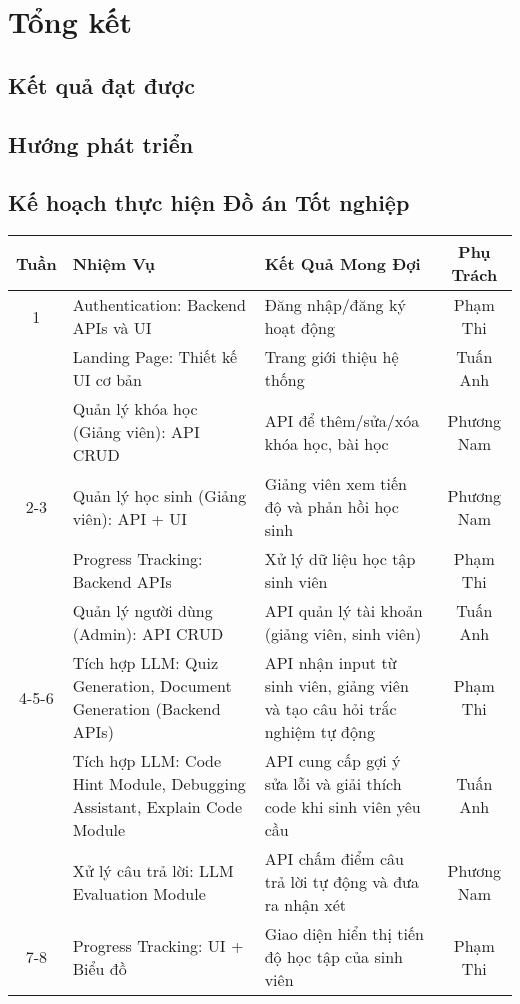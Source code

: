 \chapter{Tổng kết}
\section{Kết quả đạt được}
\section{Hướng phát triển}
\newpage
\section*{Kế hoạch thực hiện Đồ án Tốt nghiệp}
\begin{table}[H]
    \centering
    \small 
    \begin{tabular}{|c|p{4.5cm}|p{6.5cm}|c|}
    \hline
    \textbf{Tuần} & \textbf{Nhiệm Vụ} & \textbf{Kết Quả Mong Đợi} & \textbf{Phụ Trách} \\ \hline
    1 & Authentication: Backend APIs và UI & Đăng nhập/đăng ký hoạt động & Phạm Thi \\ \hline
      & Landing Page: Thiết kế UI cơ bản & Trang giới thiệu hệ thống & Tuấn Anh \\ \hline
      & Quản lý khóa học (Giảng viên): API CRUD & API để thêm/sửa/xóa khóa học, bài học & Phương Nam \\ \hline
    2-3 & Quản lý học sinh (Giảng viên): API + UI & Giảng viên xem tiến độ và phản hồi học sinh & Phương Nam \\ \hline
        & Progress Tracking: Backend APIs & Xử lý dữ liệu học tập sinh viên & Phạm Thi \\ \hline
        & Quản lý người dùng (Admin): API CRUD & API quản lý tài khoản (giảng viên, sinh viên) & Tuấn Anh \\ \hline
    4-5-6 & Tích hợp LLM: Quiz Generation, Document Generation (Backend APIs) & API nhận input từ sinh viên, giảng viên và tạo câu hỏi trắc nghiệm tự động & Phạm Thi \\ \hline
        & Tích hợp LLM: Code Hint Module, Debugging Assistant, Explain Code Module & API cung cấp gợi ý sửa lỗi và giải thích code khi sinh viên yêu cầu & Tuấn Anh \\ \hline
        & Xử lý câu trả lời: LLM Evaluation Module & API chấm điểm câu trả lời tự động và đưa ra nhận xét & Phương Nam \\ \hline
    7-8 & Progress Tracking: UI + Biểu đồ & Giao diện hiển thị tiến độ học tập của sinh viên & Phạm Thi \\ \hline

\end{tabular}
\end{table}

